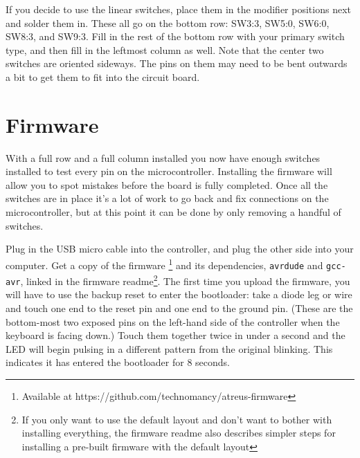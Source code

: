 \documentclass{article}
\begin{document}
If you decide to use the linear switches, place them in the modifier
positions next and solder them in. These all go on the bottom row:
SW3:3, SW5:0, SW6:0, SW8:3, and SW9:3. Fill in the rest of the bottom
row with your primary switch type, and then fill in the leftmost
column as well. Note that the center two switches are oriented
sideways. The pins on them may need to be bent outwards a bit to get
them to fit into the circuit board.

\vspace{1em}
\noindent{}
\vspace{1em}

\section{Firmware}

With a full row and a full column installed you now have enough
switches installed to test every pin on the
microcontroller. Installing the firmware will allow you to spot
mistakes before the board is fully completed. Once all the switches
are in place it's a lot of work to go back and fix connections on the
microcontroller, but at this point it can be done by only removing a
handful of switches.

\vspace{1em}

Plug in the USB micro cable into the controller, and plug the other
side into your computer. Get a copy of the
firmware \footnote{Available at
  https://github.com/technomancy/atreus-firmware} and its
dependencies, \texttt{avrdude} and \texttt{gcc-avr}, linked in the
firmware readme\footnote{If you only want to use the default layout
  and don't want to bother with installing everything, the firmware
  readme also describes simpler steps for installing a pre-built
  firmware with the default layout}. The first time you upload the
firmware, you will have to use the backup reset to enter the
bootloader: take a diode leg or wire and touch one end to the reset
pin and one end to the ground pin. (These are the bottom-most two
exposed pins on the left-hand side of the controller when the keyboard
is facing down.) Touch them together twice in under a second and the
LED will begin pulsing in a different pattern from the original
blinking. This indicates it has entered the bootloader for 8 seconds.
\end{document}
